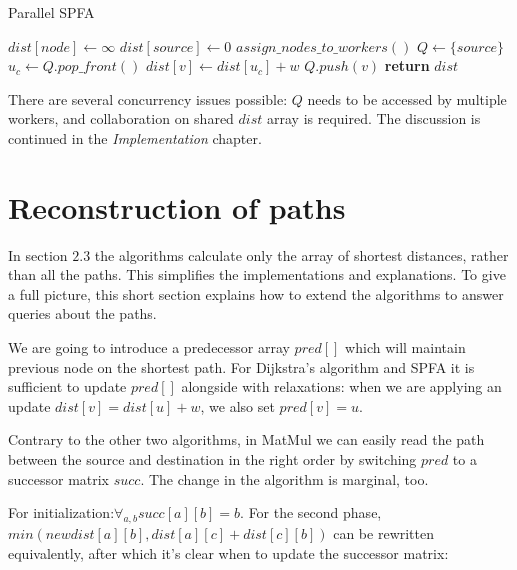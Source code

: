\documentclass[12pt,a4paper,twoside,openright]{report}
\begin{document}
\begin{algorithm}
\caption{Parallel SPFA}\label{pspfa}
\begin{algorithmic}[1]
    \State $dist[node] \gets \infty$
\EndFor
\State $dist[source] \gets 0$
\State $assign\_nodes\_to\_workers()$
\State $Q \gets \{source\}$ 
        \State $u_c \gets Q.pop\_front()$
            \State $dist[v] \gets dist[u_c] + w$
                \State $Q.push(v)$
                \EndIf
        \EndIf
        \EndFor
      \EndFor
    \EndWhile
\State \textbf{return} $dist$
\EndProcedure
\end{algorithmic}
\end{algorithm}

There are several concurrency issues possible: $Q$ needs to be accessed by multiple workers, and collaboration on shared $dist$ array is required. The discussion is continued in the \textit{Implementation} chapter.

\section{Reconstruction of paths}
In section $2.3$ the algorithms calculate only the array of shortest distances, rather than all the paths. This simplifies the implementations and explanations. To give a full picture, this short section explains how to extend the algorithms to answer queries about the paths.

We are going to introduce a predecessor array $pred[]$ which will maintain previous node on the shortest path. For Dijkstra's algorithm and SPFA it is sufficient to update $pred[]$ alongside with relaxations: when we are applying an update $dist[v] = dist[u] + w$, we also set $pred[v] = u$.

Contrary to the other two algorithms, in MatMul we can easily read the path between the source and destination in the right order by switching $pred$ to a successor matrix $succ$. The change in the algorithm is marginal, too. 

For initialization:$\displaystyle\mathop{\forall}_{a,b}succ[a][b] = b$. For the second phase, $min(newdist[a][b],dist[a][c]+dist[c][b])$ can be rewritten equivalently, after which it's clear when to update the successor matrix:
\end{document}
